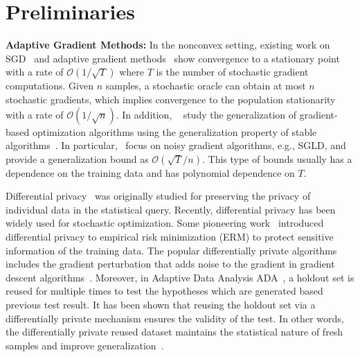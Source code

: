 \documentclass[11pt]{article}
\begin{document}
\vspace{-0.05in}
\section{Preliminaries}
\vspace{-0.05in}

{\bf Adaptive Gradient Methods:} 
In the nonconvex setting, existing work on SGD~\citep{ghla2013} and adaptive gradient methods~\citep{zare18, wawu19, zosh2019, cheli2019} show convergence to a stationary point with a rate of  $\mathcal{O}(1/\sqrt{T})$ where $T$ is the number of stochastic gradient computations. Given $n$ samples, a stochastic oracle can obtain at most $n$ stochastic gradients, which implies convergence to the population stationarity with a rate of $\mathcal{O}(1/\sqrt{n})$.
In addition, ~\citet{kula2018, rara2017, hare2016,mowa2018, pejo2018, cheli2019, lilu2019} study the generalization of gradient-based optimization algorithms using the generalization property of stable algorithms~\cite{boel02}. 
In particular,~\citet{rara2017, mowa2018, lilu2019, pejo2018} focus on noisy gradient algorithms, e.g., \textsc{SGLD}, and provide a generalization bound as $\mathcal{O}(\sqrt{T}/n)$. 
This type of bounds usually has a dependence on the training data and has polynomial dependence on $T$.  

Differential privacy~\cite{dwro2014} was originally studied for preserving the privacy of individual data in the statistical query. 
Recently, differential privacy has been widely used for stochastic optimization. 
Some pioneering work~\citep{chmo2011, basm2014, waye2017} introduced differential privacy to empirical risk minimization (ERM) to protect sensitive information of the training data. 
The popular differentially private algorithms includes the gradient perturbation that adds noise to the gradient in gradient descent algorithms~\citep{chmo2011,basm2014,waxu2019}.
Moreover, in Adaptive Data Analysis \textsc{ADA}~\citep{dwfe2015a,dwfe2015b,dwfe2015c}, a holdout set is reused for multiple times to test the hypotheses which are generated based previous test result.  
It has been shown that reusing the holdout set via a differentially private mechanism ensures the validity of the test. 
In other words, the differentially private reused dataset maintains the statistical nature of fresh samples and improve generalization~\citep{zhch2018}. 
\end{document}
